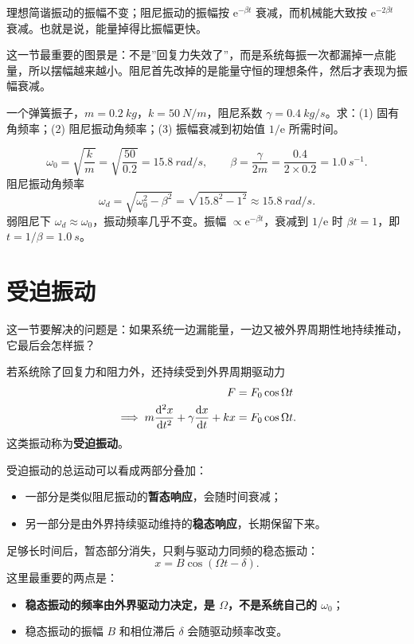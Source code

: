 \documentclass[lang=cn,11pt]{elegantbook}
\begin{document}
\begin{note}
理想简谐振动的振幅不变；阻尼振动的振幅按 \(\mathrm{e}^{-\beta t}\) 衰减，而机械能大致按 \(\mathrm{e}^{-2\beta t}\) 衰减。也就是说，能量掉得比振幅更快。
\end{note}

\begin{remark}
这一节最重要的图景是：不是”回复力失效了”，而是系统每振一次都漏掉一点能量，所以摆幅越来越小。阻尼首先改掉的是能量守恒的理想条件，然后才表现为振幅衰减。
\end{remark}

\begin{example}
一个弹簧振子，\(m=\SI{0.2}{kg}\)，\(k=\SI{50}{N/m}\)，阻尼系数 \(\gamma=\SI{0.4}{kg/s}\)。求：(1) 固有角频率；(2) 阻尼振动角频率；(3) 振幅衰减到初始值 \(1/\mathrm{e}\) 所需时间。
\end{example}
\begin{solution}
\[
\omega_0=\sqrt{\frac{k}{m}}=\sqrt{\frac{50}{0.2}}=\SI{15.8}{rad/s},\qquad
\beta=\frac{\gamma}{2m}=\frac{0.4}{2\times0.2}=\SI{1.0}{s^{-1}}.
\]
阻尼振动角频率
\[
\omega_d=\sqrt{\omega_0^2-\beta^2}=\sqrt{15.8^2-1^2}\approx\SI{15.8}{rad/s}.
\]
弱阻尼下 \(\omega_d\approx\omega_0\)，振动频率几乎不变。振幅 \(\propto\mathrm{e}^{-\beta t}\)，衰减到 \(1/\mathrm{e}\) 时 \(\beta t=1\)，即 \(t=1/\beta=\SI{1.0}{s}\)。
\end{solution}

\section{受迫振动}

这一节要解决的问题是：如果系统一边漏能量，一边又被外界周期性地持续推动，它最后会怎样振？

若系统除了回复力和阻力外，还持续受到外界周期驱动力
\[
\begin{aligned}
F&=F_0\cos\Omega t\\
\implies m\dv[2]{x}{t}+\gamma\dv{x}{t}+kx&=F_0\cos\Omega t.
\end{aligned}
\]
这类振动称为\textbf{受迫振动}。

受迫振动的总运动可以看成两部分叠加：
\begin{itemize}
  \item 一部分是类似阻尼振动的\textbf{暂态响应}，会随时间衰减；
  \item 另一部分是由外界持续驱动维持的\textbf{稳态响应}，长期保留下来。
\end{itemize}

足够长时间后，暂态部分消失，只剩与驱动力同频的稳态振动：
\[
x=B\cos(\Omega t-\delta).
\]
这里最重要的两点是：
\begin{itemize}
  \item \textbf{稳态振动的频率由外界驱动力决定，是 \(\Omega\)，不是系统自己的 \(\omega_0\)}；
  \item 稳态振动的振幅 \(B\) 和相位滞后 \(\delta\) 会随驱动频率改变。
\end{itemize}
\end{document}
